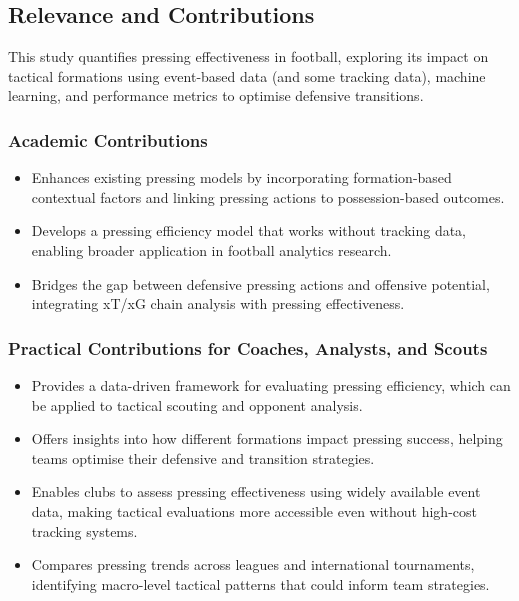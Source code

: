 \documentclass[12pt]{article}
\begin{document}
\subsection{Relevance and Contributions}

This study quantifies pressing effectiveness in football, exploring its impact on tactical formations using event-based data (and some tracking data), machine learning, and performance metrics to optimise defensive transitions.

\subsubsection{Academic Contributions}

\begin{itemize}
    \item Enhances existing pressing models by incorporating formation-based contextual factors and linking pressing actions to possession-based outcomes.
    \item Develops a pressing efficiency model that works without tracking data, enabling broader application in football analytics research.
    \item Bridges the gap between defensive pressing actions and offensive potential, integrating xT/xG chain analysis with pressing effectiveness.
\end{itemize}


\subsubsection{Practical Contributions for Coaches, Analysts, and Scouts}

\begin{itemize}
    \item Provides a data-driven framework for evaluating pressing efficiency, which can be applied to tactical scouting and opponent analysis.
    \item Offers insights into how different formations impact pressing success, helping teams optimise their defensive and transition strategies.
    \item Enables clubs to assess pressing effectiveness using widely available event data, making tactical evaluations more accessible even without high-cost tracking systems.
    \item Compares pressing trends across leagues and international tournaments, identifying macro-level tactical patterns that could inform team strategies.
\end{itemize}
\end{document}
